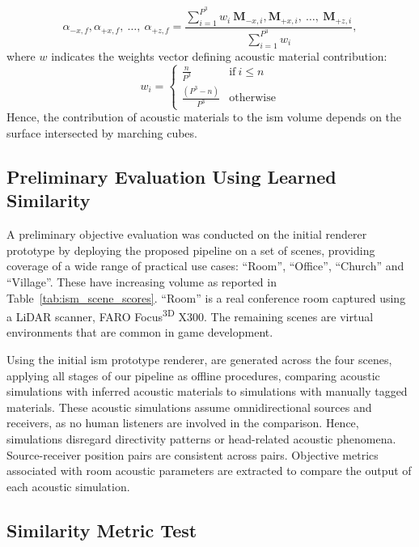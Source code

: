 \begin{equation}
    \alpha_{-x,f}, \alpha_{+x,f},~\dots,~\alpha_{+z,f} = \frac{ \sum_{i=1}^{P^3} w_i~\mathbf{M}_{-x,i}, \mathbf{M}_{+x,i},~\dots,~\mathbf{M}_{+z,i} }{ \sum_{i = 1}^{P^3} w_i},
\label{eq:weighted_average}
\end{equation}
where $w$ indicates the weights vector defining acoustic material contribution: 
\begin{equation}
    w_i = \begin{cases}
        \frac{n}{P^3}& \text{if}~i \leq n \\
        \frac{(P^3 - n)}{P^3}& \text{otherwise}
    \end{cases}
\label{eq:patch_contribution}
\end{equation}
Hence, the contribution of acoustic materials to the \acrshort{ism} volume depends on the surface intersected by marching cubes.

\subsection{Preliminary Evaluation Using Learned Similarity}
A preliminary objective evaluation was conducted on the initial renderer prototype by deploying the proposed pipeline on a set of scenes, providing coverage of a wide range of practical use cases: ``Room'', ``Office'', ``Church'' and ``Village''. These have increasing volume as reported in Table~\ref{tab:ism_scene_scores}. ``Room'' is a real conference room captured using a LiDAR scanner, FARO Focus\textsuperscript{3D} X300. The remaining scenes are virtual environments that are common in game development. \par
Using the initial \acrshort{ism} prototype renderer,  are generated across the four scenes, applying all stages of our pipeline as offline procedures, comparing acoustic simulations with inferred acoustic materials to simulations with manually tagged materials. These acoustic simulations assume omnidirectional sources and receivers, as no human listeners are involved in the comparison. Hence, simulations disregard directivity patterns or head-related acoustic phenomena. Source-receiver position pairs are consistent across  pairs. Objective metrics associated with room acoustic parameters are extracted to compare the output of each acoustic simulation.\par

\subsection{Similarity Metric Test}
